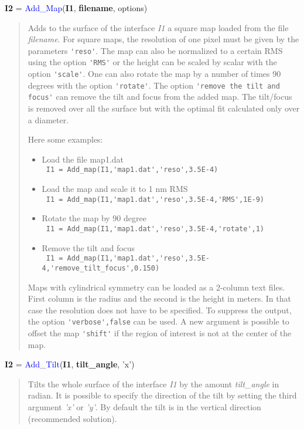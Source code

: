 \noindent \textbf{I2} = \textcolor{blue}{Add\_Map}(\textbf{I1}, \textbf{filename}, options)
\vspace*{-0.2cm}
\begin{quote}
Adds to the surface of the interface \textsl{I1} a square map loaded from the file \textsl{filename}. For square maps, the resolution of one pixel must be given by the parameters \verb?'reso'?. The map can also be normalized to a certain RMS using the option \verb?'RMS'? or the height can be scaled by scalar with the option \verb?'scale'?. One can also rotate the map by a number of times 90 degrees with the option \verb?'rotate'?. The option \verb?'remove the tilt and focus'? can remove the tilt and focus from the added map. The tilt/focus is removed over all the surface but with the optimal fit calculated only over a diameter.

Here some examples:
\begin{itemize}
  \item Load the file map1.dat \\
        \verb? I1 = Add_map(I1,'map1.dat','reso',3.5E-4) ?
  \item Load the map and scale it to 1 nm RMS \\
        \verb? I1 = Add_map(I1,'map1.dat','reso',3.5E-4,'RMS',1E-9) ?
  \item Rotate the map by 90 degree \\
        \verb? I1 = Add_map(I1,'map1.dat','reso',3.5E-4,'rotate',1) ?
  \item Remove the tilt and focus \\
         \verb? I1 = Add_map(I1,'map1.dat','reso',3.5E-4,'remove_tilt_focus',0.150) ?
\end{itemize}

Maps with cylindrical symmetry can be loaded as a 2-column text files. First column is the radius and the second is the height in meters. In that case the resolution does not have to be specified. To suppress the output, the option \verb?'verbose',false? can be used. A new argument is possible to offset the map \verb?'shift'? if the region of interest is not at the center of the map.
\end{quote}


\noindent \textbf{I2} = \textcolor{blue}{Add\_Tilt}(\textbf{I1}, \textbf{tilt\_angle}, 'x')
\vspace*{-0.2cm}
\begin{quote}
Tilts the whole surface of the interface \textsl{I1} by the amount \textsl{tilt\_angle} in radian. It is possible to specify the direction of the tilt by setting the third argument \textsl{'x'} or \textsl{'y'}. By default the tilt is in the vertical direction (recommended solution).
\end{quote}


